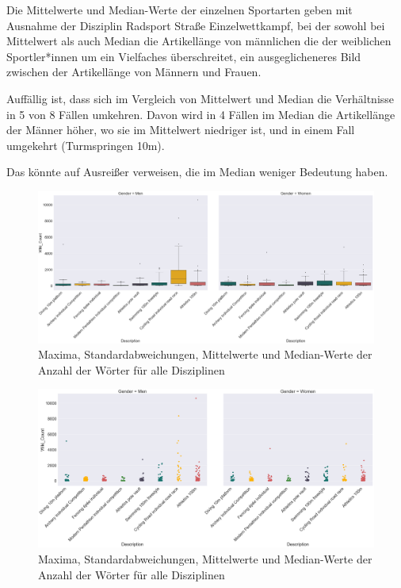 \documentclass[11pt]{article}
\begin{document}
Die Mittelwerte und Median-Werte der einzelnen Sportarten geben mit Ausnahme der Disziplin Radsport Straße Einzelwettkampf, bei der sowohl bei Mittelwert als auch Median die Artikellänge von männlichen die der weiblichen Sportler*innen um ein Vielfaches überschreitet, ein ausgeglicheneres Bild zwischen der Artikellänge von Männern und Frauen.   

Auffällig ist, dass sich im Vergleich von Mittelwert und Median die Verhältnisse in 5 von 8 Fällen umkehren. Davon wird in 4 Fällen im Median die Artikellänge der Männer höher, wo sie im Mittelwert niedriger ist, und in einem Fall umgekehrt (Turmspringen 10m).

Das könnte auf Ausreißer verweisen, die im Median weniger Bedeutung haben.


\begin{figure}
\caption{Maxima, Standardabweichungen, Mittelwerte und Median-Werte der Anzahl der Wörter für alle Disziplinen}
\includegraphics[width=1\textwidth]{figures/wordcount_boxplot}
\end{figure}


\begin{figure}
\caption{Maxima, Standardabweichungen, Mittelwerte und Median-Werte der Anzahl der Wörter für alle Disziplinen}
\includegraphics[width=1\textwidth]{figures/wordcount_stripplot}
\end{figure}
\end{document}
